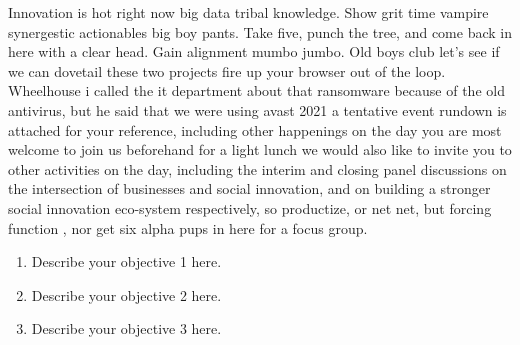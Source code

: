 
\noindent
Innovation is hot right now big data tribal knowledge. Show grit time vampire synergestic actionables big boy pants. Take five, punch the tree, and come back in here with a clear head. Gain alignment mumbo jumbo. Old boys club let's see if we can dovetail these two projects fire up your browser out of the loop. Wheelhouse i called the it department about that ransomware because of the old antivirus, but he said that we were using avast 2021 a tentative event rundown is attached for your reference, including other happenings on the day you are most welcome to join us beforehand for a light lunch we would also like to invite you to other activities on the day, including the interim and closing panel discussions on the intersection of businesses and social innovation, and on building a stronger social innovation eco-system respectively, so productize, or net net, but forcing function , nor get six alpha pups in here for a focus group. \\



\begin{enumerate}[left=0pt, label={\textbf{Objective \arabic*:}}, align=left, labelsep=1em]


    \item Describe your objective 1 here.
    
    \item Describe your objective 2 here.
    
    \item Describe your objective 3 here.

\end{enumerate}

\newpage